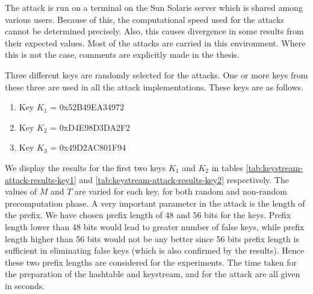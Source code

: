 The attack is run on a terminal on the Sun Solaris server which is shared among various users. Because of this, the computational speed used for the attacks cannot be determined precisely. Also, this causes divergence in some results from their expected values. Most of the attacks are carried in this environment. Where this is not the case, comments are explicitly made in the thesis. 

Three different keys are randomly selected for the attacks. One or more keys from these three are used in all the attack implementations. These keys are as follows.

\begin{enumerate}
\item Key $K_1$ = 0x52B49EA34972
\item Key $K_2$ = 0xD4E98D3DA2F2
\item Key $K_3$ = 0x49D2AC801F94
\end{enumerate}

We display the results for the first two keys $K_1$ and $K_2$ in tables \ref{tab:keystream-attack-results-key1} and \ref{tab:keystream-attack-results-key2} respectively. The values of $M$ and $T$ are varied for each key, for both random and non-random precomputation phase. A very important parameter in the attack is the length of the prefix. We have chosen prefix length of $48$ and $56$ bits for the keys. Prefix length lower than 48 bits would lead to greater number of false keys, while prefix length higher than 56 bits would not be any better since 56 bits prefix length is sufficient in eliminating false keys (which is also confirmed by the results). Hence these two prefix lengths are considered for the experiments. The time taken for the preparation of the hashtable and keystream, and for the attack are all given in seconds. 

